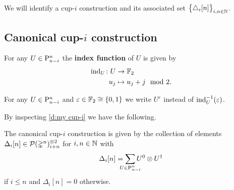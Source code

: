 We will identify a \mbox{cup-$i$} construction and its associated set $\big\{ \triangle_i [n] \big\}_{i,n \in \mathbb{N}}$.

\subsection{Canonical \mbox{cup-$i$} construction}

\begin{definition}
	For any $U \in \mathrm{P}^n_{n-i}$ the \textbf{index function} of $U$ is given by
	\[
	\begin{split}
	\operatorname{ind}_U \colon U &\to {\mathbb{F}_2} \\
	u_j &\mapsto u_j + j \mod 2.
	\end{split}
	\]
\end{definition}

\begin{notation*}
	For any $U \in \mathrm{P}^n_{n-i}$ and $\varepsilon \in {\mathbb{F}_2} \cong \{0,1\}$ we write $U^\varepsilon$ instead of $\operatorname{ind}_U^{-1}(\varepsilon)$.
\end{notation*}

By inspecting \cref{d:my cup-i} we have the following.

\begin{lemma}\label{l:canonical}
	The canonical \mbox{cup-$i$} construction is given by the collection of elements $\Delta_i[n] \in \mathcal{P}(\mathbb{\Delta}^n)^{\otimes 2}_{i+n}$ for $i,n \in \mathbb{N}$ with
	\[
	\Delta_i[n] =
	\sum_{\mathclap{U \in \rP^n_{n-i}}} U^0 \ot U^1
	\]
	if $i \leq n$ and $\Delta_i[n] = 0$ otherwise.
\end{lemma}